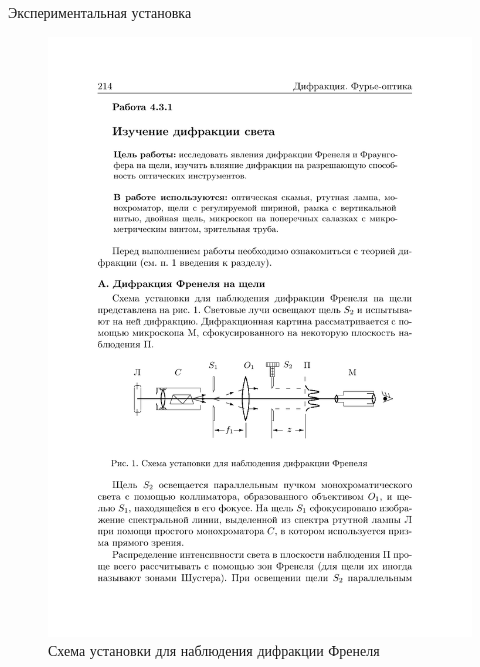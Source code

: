 \documentclass[11pt]{beamer} %
\begin{document}
    \begin{frame}{Экспериментальная установка}
    \small
    \begin{figure}[H]
        \centering
        \includegraphics[width = \textwidth]{images/a.pdf}
        \caption{Схема установки для наблюдения дифракции Френеля}
        \label{fig:inst_a}
    \end{figure}
	\end{frame}
    
\end{document}
